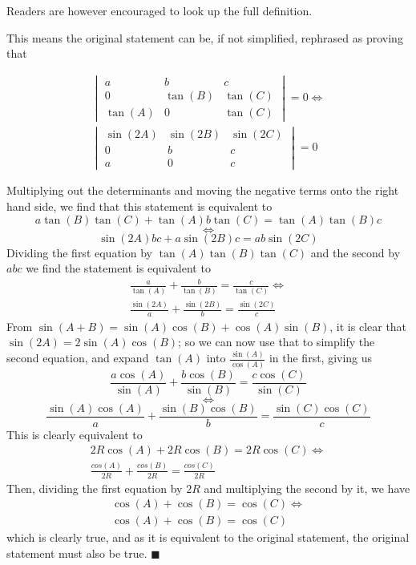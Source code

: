 Readers are however encouraged to look up the full definition.

This means the original statement can be, if not simplified, rephrased as proving that

\[
\begin{split}
\begin{vmatrix}
a&b&c\\
0&\tan(B)&\tan(C)
\\\tan(A)&0&\tan(C)
\end{vmatrix}
=0
\iff{}
\\
\begin{vmatrix}
\sin(2A)&\sin(2B)&\sin(2C)\\
0&b&c\\
a&0&c
\end{vmatrix}
=0
\end{split}{}
\]

Multiplying out the determinants and moving the negative terms onto the right hand side, we find that this statement is equivalent to
\[a\tan(B)\tan(C)+\tan(A)b\tan(C)=\tan(A)\tan(B)c\]\[\iff{}\]\[\sin(2A)bc+a\sin(2B)c=ab\sin(2C)
\]
Dividing the first equation by \(\tan(A)\tan(B)\tan(C)\) and the second by \(abc\) we find the statement is equivalent to
\[
\begin{split}
\frac{a}{\tan(A)}+\frac{b}{\tan(B)}=\frac{c}{\tan(C)}
\iff \\
\frac{\sin(2A)}{a}+\frac{\sin(2B)}{b}=\frac{\sin(2C)}{c}
\end{split}
\]
From \(\sin(A+B)=\sin(A)\cos(B)+\cos(A)\sin(B)\), it is clear that \(\sin(2A)=2\sin(A)\cos(B)\); so we can now use that to simplify the second equation, and expand \(\tan(A)\) into \(\frac{\sin(A)}{\cos(A)}\) in the first, giving us
\[
\frac{a\cos(A)}{\sin(A)}+\frac{b\cos(B)}{\sin(B)}=\frac{c\cos(C)}{\sin(C)}\]
\[\iff\]
\[\frac{\sin(A)\cos(A)}{a}+\frac{\sin(B)\cos(B)}{b}=\frac{\sin(C)\cos(C)}{c}
\]
This is clearly equivalent to
\[\begin{split}
2R\cos(A)+2R\cos(B)=2R\cos(C)
\iff\\
\frac{cos(A)}{2R}+\frac{cos(B)}{2R}=\frac{cos(C)}{2R}
\end{split}
\]
Then, dividing the first equation by \(2R\) and multiplying the second by it, we have
\[\begin{split}
\cos(A)+\cos(B)=\cos(C)
\iff\\
\cos(A)+\cos(B)=\cos(C)
\end{split}
\]
which is clearly true, and as it is equivalent to the original statement, the original statement must also be true. \(\blacksquare{}\)
